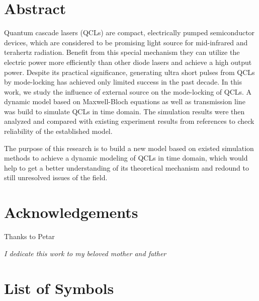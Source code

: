 \documentclass[11pt,final]{scrbook}
\begin{document}







\chapter*{Abstract}
Quantum cascade lasers (QCLs) are compact, electrically pumped semiconductor devices, which are considered to be promising light source for mid-infrared and terahertz radiation. Benefit from this special mechanism they can utilize the electric power more efficiently than other diode lasers and achieve a high output power. Despite its practical significance, generating ultra short pulses from QCLs by mode-locking has achieved only limited success in the past decade. In this work, we study the influence of external source on the mode-locking of QCLs. A dynamic model based on Maxwell-Bloch equations as well as transmission line was build to simulate QCLs in time domain. The simulation results were then analyzed and compared with existing experiment results from references to check reliability of the established model.

The purpose of this research is to build a new model based on existed simulation methods to achieve a dynamic modeling of QCLs in time domain, which would help to get a better understanding of its theoretical mechanism and redound to still unresolved issues of the field.

\chapter*{Acknowledgements} 

Thanks to Petar

\clearpage
\thispagestyle{empty}

\vspace*{2cm}
\begin{center}
{\normalfont\itshape  I dedicate this work to my beloved mother and father}
\end{center}

\chapter*{List of Symbols}


\end{document}
